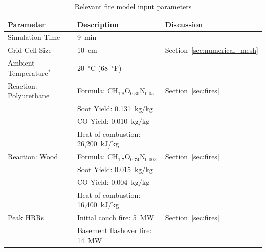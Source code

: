 \documentclass[12pt,oneside]{book}
\renewcommand{\C}{\mbox{C}}
\renewcommand{\H}{\mbox{H}}
\renewcommand{\O}{\mbox{O}}
\newcommand{\N}{\mbox{N}}
\begin{document}
\begin{table}[!ht]
\caption[Relevant fire model input parameters]
{Relevant fire model input parameters}
\begin{tabular}{lll}
\toprule
Parameter                                    &  Description                                  &  Discussion                        \\
\midrule
Simulation Time                              &  9~min                                        &  --                                \\
Grid Cell Size                               &  10~cm                                        &  Section~\ref{sec:numerical_mesh}  \\
Ambient Temperature$^*$                      &  20~$^{\circ}$C (68~$^{\circ}$F)              &  --                                \\
Reaction: Polyurethane~\cite{SFPE:Tewarson}  &  Formula: $\C\H_{1.8}\O_{0.30}\N_{0.05}$      &  Section~\ref{sec:fires}           \\
                                             &  Soot Yield: 0.131~$\mathrm{kg}/\mathrm{kg}$  &                                    \\
                                             &  CO Yield: 0.010~$\mathrm{kg}/\mathrm{kg}$    &                                    \\
                                             &  Heat of combustion: 26,200~kJ/kg             &                                    \\
Reaction: Wood~\cite{SFPE:Tewarson}          &  Formula: $\C\H_{1.7}\O_{0.74}\N_{0.002}$     &  Section~\ref{sec:fires}           \\
                                             &  Soot Yield: 0.015~$\mathrm{kg}/\mathrm{kg}$  &                                    \\
                                             &  CO Yield: 0.004~$\mathrm{kg}/\mathrm{kg}$    &                                    \\
                                             &  Heat of combustion: 16,400~kJ/kg             &                                    \\
Peak HRRs                                    &  Initial couch fire: 5~MW                     &  Section~\ref{sec:fires}           \\
                                             &  Basement flashover fire: 14~MW               &                                    \\

\end{tabular}
\end{table}
\end{document}
